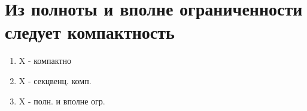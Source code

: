 \documentclass[geometry.tex]{subfiles}
\begin{document}
  \section{Из полноты и вполне ограниченности следует компактность}

  \begin{theorem} [равносильные]
          \begin{enumerate}
              \item X - компактно
              \item X - секцвенц. комп.
              \item X - полн. и вполне огр.
          \end{enumerate}
  \end{theorem}
\end{document}

